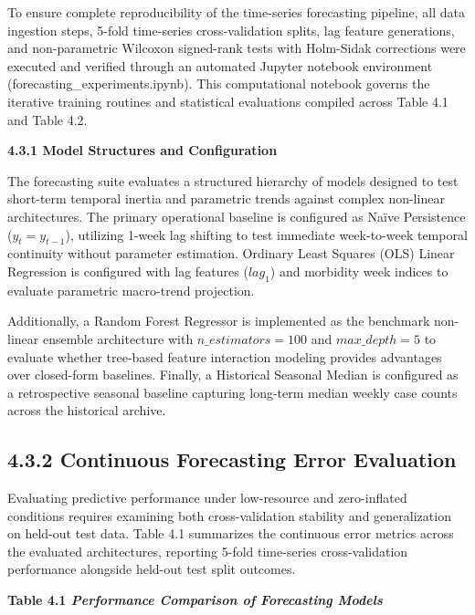 \documentclass[
]{article}
\begin{document}
To ensure complete reproducibility of the time-series forecasting
pipeline, all data ingestion steps, 5-fold time-series cross-validation
splits, lag feature generations, and non-parametric Wilcoxon signed-rank
tests with Holm-Sidak corrections were executed and verified through an
automated Jupyter notebook environment (forecasting\_experiments.ipynb).
This computational notebook governs the iterative training routines and
statistical evaluations compiled across Table 4.1 and Table 4.2.

\textbf{4.3.1 Model Structures and Configuration}

The forecasting suite evaluates a structured hierarchy of models
designed to test short-term temporal inertia and parametric trends
against complex non-linear architectures. The primary operational
baseline is configured as Naïve Persistence (\(y_{t} = y_{t - 1}\)),
utilizing 1-week lag shifting to test immediate week-to-week temporal
continuity without parameter estimation. Ordinary Least Squares (OLS)
Linear Regression is configured with lag features (\(lag_{1}\)) and
morbidity week indices to evaluate parametric macro-trend projection.

Additionally, a Random Forest Regressor is implemented as the benchmark
non-linear ensemble architecture with \(n\_ estimators = 100\) and
\(max\_ depth = 5\) to evaluate whether tree-based feature interaction
modeling provides advantages over closed-form baselines. Finally, a
Historical Seasonal Median is configured as a retrospective seasonal
baseline capturing long-term median weekly case counts across the
historical archive.

\subsection{\texorpdfstring{\textbf{4.3.2 Continuous Forecasting Error
Evaluation}}{4.3.2 Continuous Forecasting Error Evaluation}}\label{continuous-forecasting-error-evaluation}

Evaluating predictive performance under low-resource and zero-inflated
conditions requires examining both cross-validation stability and
generalization on held-out test data. Table 4.1 summarizes the
continuous error metrics across the evaluated architectures, reporting
5-fold time-series cross-validation performance alongside held-out test
split outcomes.

\textbf{Table 4.1 \emph{Performance Comparison of Forecasting Models}}
\end{document}
